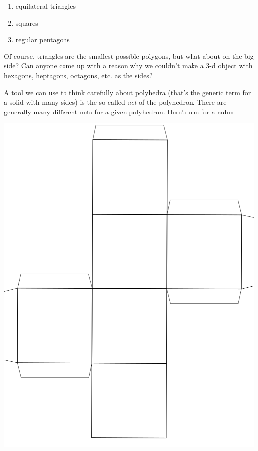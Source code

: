 \begin{enumerate}
    \item equilateral triangles
    \item squares
    \item regular pentagons
\end{enumerate}

Of course, triangles are the smallest possible polygons, but what about on the big side?  Can anyone come up with a reason why we couldn't make a 3-d object with hexagons, heptagons, octagons, etc. as the sides?

\vspace{1in}

A tool we can use to think carefully about polyhedra (that's the generic term for a solid with many sides) is the so-called {\em net} of the polyhedron.  There are generally many different nets for a given polyhedron.  Here's one for a cube:
\bigskip

\centerline{\includegraphics[scale=.25]{images/cube-net.png}}

